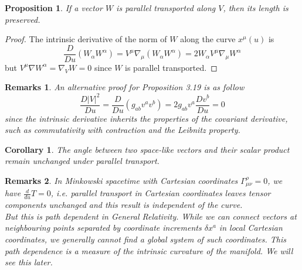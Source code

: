 \documentclass[a4paper]{article}
\newtheorem{remarks}{Remarks}[section]
\theoremstyle{new}
\newtheorem{prop}{Proposition}[section]
\newtheorem{cor}{Corollary}[section]
\begin{document}
\begin{prop}
If a vector $W$ is parallel transported along $V$, then its length is preserved.
\end{prop}
\begin{proof}
The intrinsic derivative of the norm of $W$ along the curve $x^\mu(u)$ is
$$\frac{D}{Du}(W_\alpha W^\alpha)=V^\mu\nabla_\mu(W_\alpha W^\alpha)=2W_\alpha V^\mu\nabla_\mu W^\alpha$$
but $V^\mu\nabla W^\alpha=\nabla_VW=0$ since $W$ is parallel transported.
\end{proof}
\begin{remarks}
An alternative proof for Proposition 3.19 is as follow
$$\frac{D|V|^2}{Du}=\frac{D}{Du}(g_{ab}v^av^b)=2g_{ab}v^a\frac{Dv^b}{Du}=0$$
since the intrinsic derivative inherits the properties of the covariant derivative, such as commutativity with contraction and the Leibnitz property.
\end{remarks}
\begin{cor}
The angle between two space-like vectors and their scalar product remain unchanged under parallel transport.
\end{cor}
\begin{remarks}
In Minkowski spacetime with Cartesian coordinates $\Gamma_{\mu\nu}^\rho=0$, we have $\frac{d}{du}T=0$, i.e. parallel transport in Cartesian coordinates leaves tensor components unchanged and this result is independent of the curve.\\[5pt]
But this is path dependent in General Relativity. While we can connect vectors at neighbouring points separated by coordinate increments $\delta x^a$ in local Cartesian coordinates, we generally cannot find a global system of such coordinates. This path dependence is a measure of the intrinsic curvature of the manifold. We will see this later.
\end{remarks}
\end{document}
